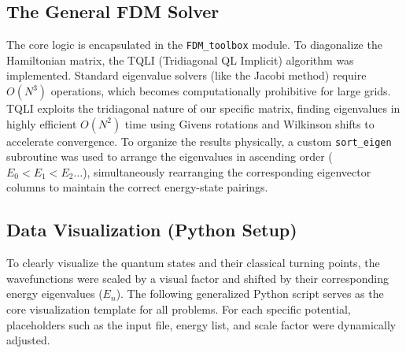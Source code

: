 \documentclass[12pt, a4paper, twoside]{article}
\begin{document}
        

        \subsection{The General FDM Solver}
        The core logic is encapsulated in the \texttt{FDM\_toolbox} module.
        To diagonalize the Hamiltonian matrix, the TQLI (Tridiagonal QL Implicit) algorithm was implemented. Standard eigenvalue solvers (like the Jacobi method) require $O(N^3)$ operations, which becomes computationally prohibitive for large grids. TQLI exploits the tridiagonal nature of our specific matrix, finding eigenvalues in highly efficient $O(N^2)$ time using Givens rotations and Wilkinson shifts to accelerate convergence. To organize the results physically, a custom \texttt{sort\_eigen} subroutine was used to arrange the eigenvalues in ascending order ($E_0 < E_1 < E_2 \dots$), simultaneously rearranging the corresponding eigenvector columns to maintain the correct energy-state pairings.

        

        \subsection{Data Visualization (Python Setup)}
        To clearly visualize the quantum states and their classical turning points, the wavefunctions were scaled by a visual factor and shifted by their corresponding energy eigenvalues ($E_n$). The following generalized Python script serves as the core visualization template for all problems. For each specific potential, placeholders such as the input file, energy list, and scale factor were dynamically adjusted.
\end{document}
